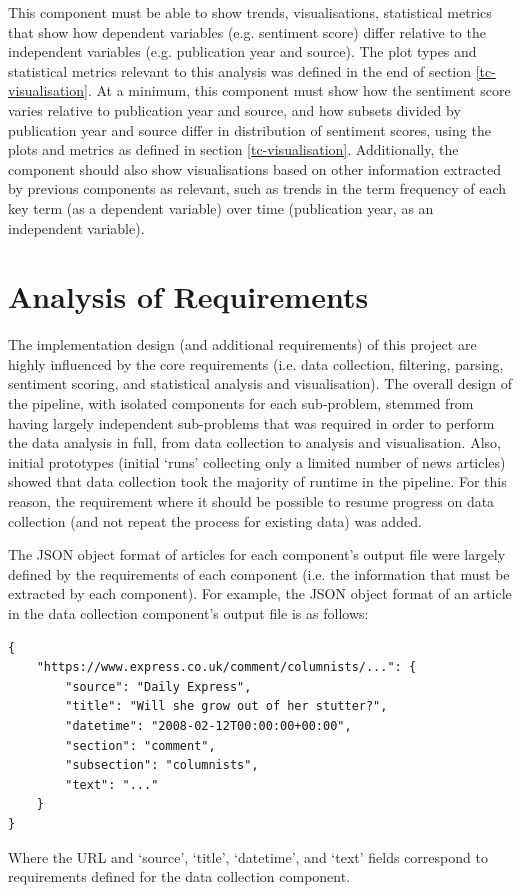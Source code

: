 \documentclass{report}
\begin{document}
This component must be able to show trends, visualisations, statistical metrics that show how dependent variables (e.g. sentiment score) differ relative to the independent variables (e.g. publication year and source).
The plot types and statistical metrics relevant to this analysis was defined in the end of section \ref{tc-visualisation}.
At a minimum, this component must show how the sentiment score varies relative to publication year and source, and how subsets divided by publication year and source differ in distribution of sentiment scores, using the plots and metrics as defined in section \ref{tc-visualisation}.
Additionally, the component should also show visualisations based on other information extracted by previous components as relevant, such as trends in the term frequency of each key term (as a dependent variable) over time (publication year, as an independent variable).


\section{Analysis of Requirements} \label{Analysis of Requirements}

The implementation design (and additional requirements) of this project are highly influenced by the core requirements (i.e. data collection, filtering, parsing, sentiment scoring, and statistical analysis and visualisation).
The overall design of the pipeline, with isolated components for each sub-problem, stemmed from having largely independent sub-problems that was required in order to perform the data analysis in full, from data collection to analysis and visualisation.
Also, initial prototypes (initial `runs' collecting only a limited number of news articles) showed that data collection took the majority of runtime in the pipeline.
For this reason, the requirement where it should be possible to resume progress on data collection (and not repeat the process for existing data) was added.

The JSON object format of articles for each component's output file were largely defined by the requirements of each component (i.e. the information that must be extracted by each component).
For example, the JSON object format of an article in the data collection component's output file is as follows:
\begin{lstlisting}
{
	"https://www.express.co.uk/comment/columnists/...": {
		"source": "Daily Express",
		"title": "Will she grow out of her stutter?",
		"datetime": "2008-02-12T00:00:00+00:00",
		"section": "comment",
		"subsection": "columnists",
		"text": "..."
	}
}
\end{lstlisting}
Where the URL and `source', `title', `datetime', and `text' fields correspond to requirements defined for the data collection component.
\end{document}
